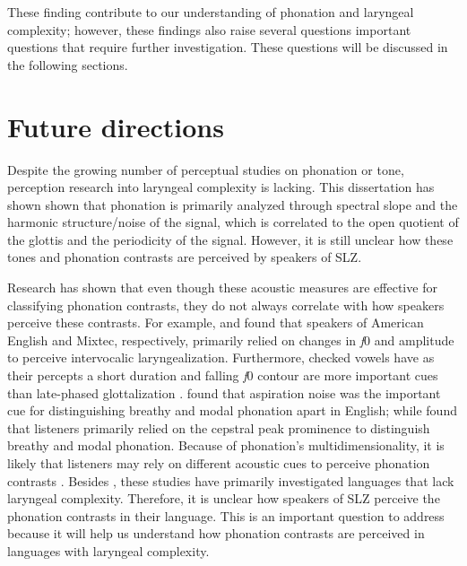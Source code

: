 These finding contribute to our understanding of phonation and laryngeal complexity; however, these findings also raise several questions important questions that require further investigation. These questions will be discussed in the following sections. 

\section{Future directions}\label{sec:future_directions}


Despite the growing number of perceptual studies on phonation or tone, perception research into laryngeal complexity is lacking. This dissertation has shown shown that phonation is primarily analyzed through spectral slope and the harmonic structure/noise of the signal, which is correlated to the open quotient of the glottis and the periodicity of the signal. However, it is still unclear how these tones and phonation contrasts are perceived by speakers of SLZ. 

Research has shown that even though these acoustic measures are effective for classifying phonation contrasts, they do not always correlate with how speakers perceive these contrasts. For example, \citet{hillenbrandRoleF0Amplitude1996} and \citet{gerfenProductionPerceptionLaryngealized2005} found that speakers of American English and Mixtec, respectively, primarily relied on changes in \textit{f}0 and amplitude to perceive intervocalic laryngealization. Furthermore, checked vowels have as their percepts a short duration and falling \textit{f}0 contour are more important cues than late-phased glottalization \citep{brunelleTonePerceptionSgaw2011,chaiPhoneticsPhonologyChecked2022,chaiPerceptionCheckedRearticulated2025,garellekVoiceQualityTone2013}. \citet{klattAnalysisSynthesisPerception1990} found that aspiration noise was the important cue for distinguishing breathy and modal phonation apart in English; while \citet{hillenbrandAcousticCorrelatesBreathy1996} found that listeners primarily relied on the cepstral peak prominence to distinguish breathy and modal phonation. Because of phonation's multidimensionality, it is likely that listeners may rely on different acoustic cues to perceive phonation contrasts \citep{espositoEffectsLinguisticExperience2010,kreimanUnifiedTheoryVoice2014,kreimanValidatingPsychoacousticModel2021}. Besides \citet{gerfenProductionPerceptionLaryngealized2005}, these studies have primarily investigated languages that lack laryngeal complexity. Therefore, it is unclear how speakers of SLZ perceive the phonation contrasts in their language. This is an important question to address because it will help us understand how phonation contrasts are perceived in languages with laryngeal complexity.

